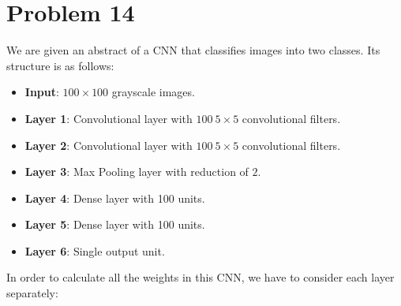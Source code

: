 \section{Problem 14}

We are given an abstract of a CNN that classifies images into two classes. Its structure is as follows:
\begin{itemize}
	\item \textbf{Input}: $100 \times 100$ grayscale images.
	\item \textbf{Layer 1}: Convolutional layer with $100 \ 5\times 5$ convolutional filters.
	\item \textbf{Layer 2}: Convolutional layer with $100 \ 5\times 5$ convolutional filters.
	\item \textbf{Layer 3}: Max Pooling layer with reduction of $2$.
	\item \textbf{Layer 4}: Dense layer with 100 units.
	\item \textbf{Layer 5}: Dense layer with 100 units.
	\item \textbf{Layer 6}: Single output unit.
\end{itemize}

In order to calculate all the weights in this CNN, we have to consider each layer separately:\\

